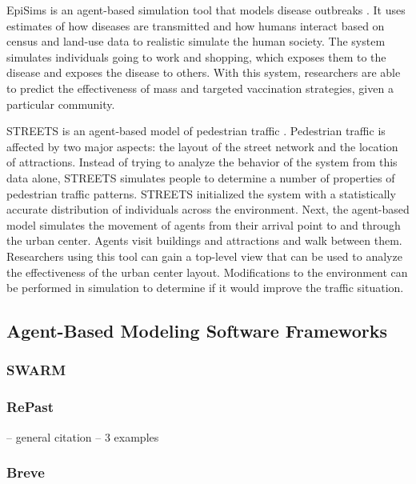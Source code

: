 EpiSims is an agent-based simulation tool that models disease outbreaks \cite{eubank2004modelling}.
It uses estimates of how diseases are transmitted and how humans interact based on census and land-use data to realistic simulate the human society.
The system simulates individuals going to work and shopping, which exposes them to the disease and exposes the disease to others.
With this system, researchers are able to predict the effectiveness of mass and targeted vaccination strategies, given a particular community.

STREETS is an agent-based model of pedestrian traffic \cite{schelhorn1999streets}.
Pedestrian traffic is affected by two major aspects: the layout of the street network and the location of attractions.
Instead of trying to analyze the behavior of the system from this data alone, STREETS simulates people to determine a number of properties of pedestrian traffic patterns.
STREETS initialized the system with a statistically accurate distribution of individuals across the environment.
Next, the agent-based model simulates the movement of agents from their arrival point to and through the urban center.
Agents visit buildings and attractions and walk between them.
Researchers using this tool can gain a top-level view that can be used to analyze the effectiveness of the urban center layout.
Modifications to the environment can be performed in simulation to determine if it would improve the traffic situation.



\subsection{Agent-Based Modeling Software Frameworks}

\subsubsection{SWARM}
   \cite{minar1996swarm}
\subsubsection{RePast}
   \cite{collier2003ref} -- general citation
   \cite{north2006experiences} -- 3 examples
\subsubsection{Breve}
   \cite{kleinbreve}
